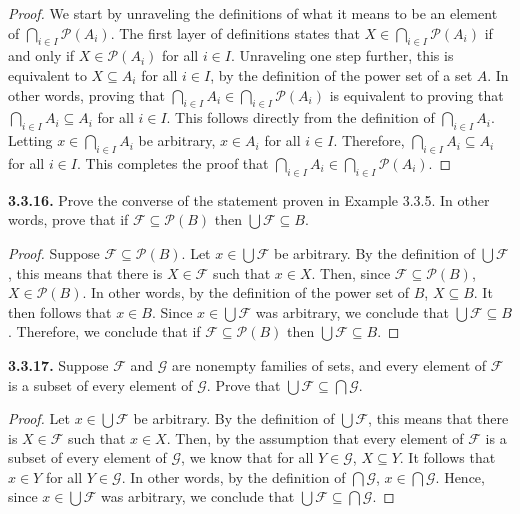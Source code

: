 \documentclass[12pt]{amsart}
\newenvironment{statement}[1]{\smallskip\noindent\color[rgb]{.6627, .3529, .6314} {\bf #1.}}{}
\theoremstyle{definition}
\theoremstyle{remark}
\newcommand{\powerset}[1]{\mathscr{P} \left( #1 \right)}
\begin{document}
\begin{proof}
We start by unraveling the definitions of what it means to be an element of $\bigcap_{i \in I} \powerset{A_i}$.
The first layer of definitions states that $X \in \bigcap_{i \in I} \powerset{A_i}$ if and only if $X \in \powerset{A_i}$ for all $i \in I$.
Unraveling one step further, this is equivalent to $X \subseteq A_i$ for all $i \in I$, by the definition of the power set of a set $A$.
In other words, proving that $\bigcap_{i \in I} A_i \in \bigcap_{i \in I} \powerset{A_i}$ is equivalent to proving that $\bigcap_{i \in I} A_i \subseteq A_i$ for all $i \in I$.
This follows directly from the definition of $\bigcap_{i \in I} A_i$.
Letting $x \in \bigcap_{i \in I} A_i$ be arbitrary, $x \in A_i$ for all $i \in I$.
Therefore, $\bigcap_{i \in I} A_i \subseteq A_i$ for all $i \in I$.
This completes the proof that $\bigcap_{i \in I} A_i \in \bigcap_{i \in I} \powerset{A_i}$.
\end{proof}


\begin{statement}{3.3.16}
Prove the converse of the statement proven in Example 3.3.5.
In other words, prove that if $\mathcal{F} \subseteq \powerset{B}$ then $\bigcup \mathcal{F} \subseteq B$.
\end{statement}

\begin{proof}
Suppose $\mathcal{F} \subseteq \powerset{B}$.
Let $x \in \bigcup \mathcal{F}$ be arbitrary.
By the definition of $\bigcup \mathcal{F}$, this means that there is $X \in \mathcal{F}$ such that $x \in X$.
Then, since $\mathcal{F} \subseteq \powerset{B}$, $X \in \powerset{B}$.
In other words, by the definition of the power set of $B$, $X \subseteq B$.
It then follows that $x \in B$.
Since $x \in \bigcup \mathcal{F}$ was arbitrary, we conclude that $\bigcup \mathcal{F} \subseteq B$.
Therefore, we conclude that if $\mathcal{F} \subseteq \powerset{B}$ then $\bigcup \mathcal{F} \subseteq B$.
\end{proof}


\begin{statement}{3.3.17}
Suppose $\mathcal{F}$ and $\mathcal{G}$ are nonempty families of sets, and every element of $\mathcal{F}$ is a subset of every element of $\mathcal{G}$.
Prove that $\bigcup \mathcal{F} \subseteq \bigcap \mathcal{G}$.
\end{statement}

\begin{proof}
Let $x \in \bigcup \mathcal{F}$ be arbitrary.
By the definition of $\bigcup \mathcal{F}$, this means that there is $X \in \mathcal{F}$ such that $x \in X$.
Then, by the assumption that every element of $\mathcal{F}$ is a subset of every element of $\mathcal{G}$, we know that for all $Y \in \mathcal{G}$, $X \subseteq Y$.
It follows that $x \in Y$ for all $Y \in \mathcal{G}$.
In other words, by the definition of $\bigcap \mathcal{G}$, $x \in \bigcap \mathcal{G}$.
Hence, since $x \in \bigcup \mathcal{F}$ was arbitrary, we conclude that $\bigcup \mathcal{F} \subseteq \bigcap \mathcal{G}$.
\end{proof}
\end{document}

